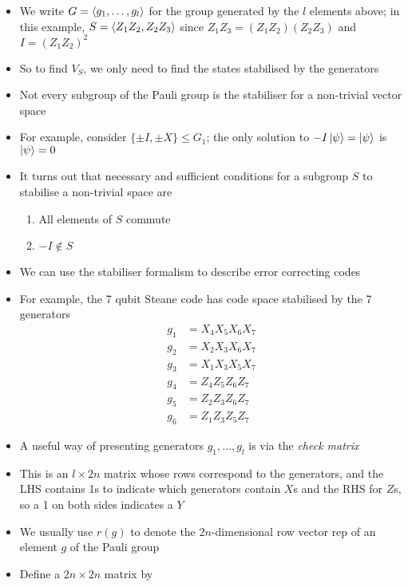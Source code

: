 \documentclass[12pt,a4paper]{article}
\numberwithin{equation}{section}
\begin{document}
\begin{itemize}
		\item We write $G=\braket{g_{1},\ldots,g_{l}}$ for the group generated by the $l$ elements above; in this example, $S=\braket{Z_{1}Z_{2},Z_{2}Z_{3}}$ since $Z_{1}Z_{3}=(Z_{1}Z_{2})(Z_{2}Z_{3})$ and $I=(Z_{1}Z_{2})^{2}$
		\item So to find $V_{S}$, we only need to find the states stabilised by the generators
		\item Not every subgroup of the Pauli group is the stabiliser for a non-trivial vector space
		\item For example, consider $\{\pm I, \pm X\}\leq G_{1}$; the only solution to $-I\ket{\psi}=\ket{\psi}$ is $\ket{\psi}=0$
		\item It turns out that necessary and sufficient conditions for a subgroup $S$ to stabilise a non-trivial space are
		\begin{enumerate}
			\item All elements of $S$ commute
			\item $-I\notin S$
		\end{enumerate}
		\item We can use the stabiliser formalism to describe error correcting codes
		\item For example, the 7 qubit Steane code has code space stabilised by the 7 generators
		\begin{equation}
			\begin{aligned}
				g_{1}&=X_{4}X_{5}X_{6}X_{7}\\
				g_{2}&=X_{2}X_{3}X_{6}X_{7}\\
				g_{3}&=X_{1}X_{3}X_{5}X_{7}\\
				g_{4}&=Z_{4}Z_{5}Z_{6}Z_{7}\\
				g_{5}&=Z_{2}Z_{3}Z_{6}Z_{7}\\
				g_{6}&=Z_{1}Z_{3}Z_{5}Z_{7}
			\end{aligned}
		\end{equation}
		\item A useful way of presenting generators $g_{1},\ldots,g_{l}$ is via the \textit{check matrix}
		\item This is an $l\times 2n$ matrix whose rows correspond to the generators, and the LHS contains 1s to indicate which generators contain $X$s and the RHS for $Z$s, so a 1 on both sides indicates a $Y$
		\item We usually use $r(g)$ to denote the $2n$-dimensional row vector rep of an element $g$ of the Pauli group
		\item Define a $2n\times 2n$ matrix by

\end{itemize}
\end{document}
